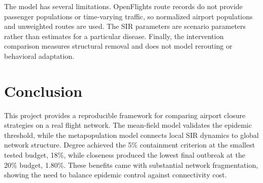 \documentclass[conference]{IEEEtran}
\begin{document}
The model has several limitations. OpenFlights route records do not provide passenger populations or time-varying traffic, so normalized airport populations and unweighted routes are used. The SIR parameters are scenario parameters rather than estimates for a particular disease. Finally, the intervention comparison measures structural removal and does not model rerouting or behavioral adaptation.

\section{Conclusion}
This project provides a reproducible framework for comparing airport closure strategies on a real flight network. The mean-field model validates the epidemic threshold, while the metapopulation model connects local SIR dynamics to global network structure. Degree achieved the 5\% containment criterion at the smallest tested budget, 18\%, while closeness produced the lowest final outbreak at the 20\% budget, 1.80\%. These benefits came with substantial network fragmentation, showing the need to balance epidemic control against connectivity cost.



\end{document}
